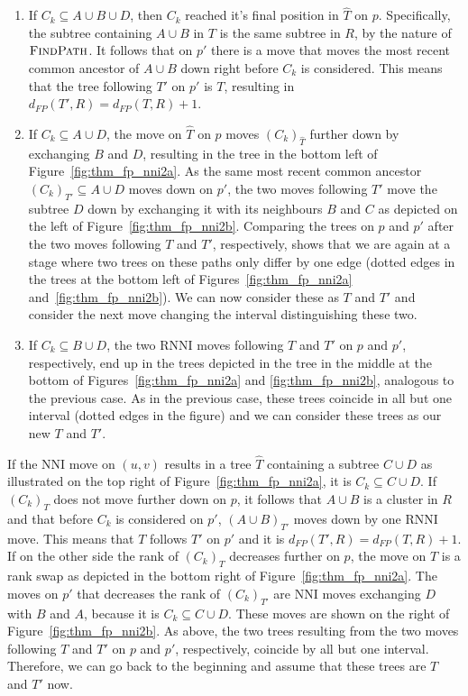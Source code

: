 \documentclass{amsart}
\newcommand{\rnni}{\mathrm{RNNI}}
\newcommand{\findpath}{\textsc{FindPath}}
\newcommand{\nni}{\mathrm{NNI}}
\begin{document}
\begin{enumerate}
    \begin{enumerate}
        \item
            If $C_k \subseteq A \cup B \cup D$, then $C_k$ reached it's final position in $\hat T$ on $p$.
            Specifically, the subtree containing $A \cup B$ in $T$ is the same subtree in $R$, by the nature of $\findpath$.
            It follows that on $p'$ there is a move that moves the most recent common ancestor of $A \cup B$ down right before $C_k$ is considered.
            This means that the tree following $T'$ on $p'$ is $T$, resulting in $d_{FP}(T',R) = d_{FP}(T,R) + 1$.
        \item
            If $C_k \subseteq A \cup D$, the move on $\hat T$ on $p$ moves $(C_k)_{\hat T}$ further down by exchanging $B$ and $D$, resulting in the tree in the bottom left of Figure~\ref{fig:thm_fp_nni2a}.
            As the same most recent common ancestor $(C_k)_{T'} \subseteq A \cup D$ moves down on $p'$, the two moves following $T'$ move the subtree $D$ down by exchanging it with its neighbours $B$ and $C$ as depicted on the left of Figure~\ref{fig:thm_fp_nni2b}.
            Comparing the trees on $p$ and $p'$ after the two moves following $T$ and $T'$, respectively, shows that we are again at a stage where two trees on these paths only differ by one edge (dotted edges in the trees at the bottom left of Figures~\ref{fig:thm_fp_nni2a} and~\ref{fig:thm_fp_nni2b}).
            We can now consider these as $T$ and $T'$ and consider the next move changing the interval distinguishing these two.
        \item
            If $C_k \subseteq B \cup D$, the two $\rnni$ moves following $T$ and $T'$ on $p$ and $p'$, respectively, end up in the trees depicted in the tree in the middle at the bottom of Figures~\ref{fig:thm_fp_nni2a} and \ref{fig:thm_fp_nni2b}, analogous to the previous case.
            As in the previous case, these trees coincide in all but one interval (dotted edges in the figure) and we can consider these trees as our new $T$ and $T'$.
    \end{enumerate}

    If the $\nni$ move on $(u,v)$ results in a tree $\hat T$ containing a subtree $C \cup D$ as illustrated on the top right of Figure~\ref{fig:thm_fp_nni2a}, it is $C_k \subseteq C \cup D$.
    If $(C_k)_T$ does not move further down on $p$, it follows that $A \cup B$ is a cluster in $R$ and that before $C_k$ is considered on $p'$, $(A \cup B)_{T'}$ moves down by one $\rnni$ move.
    This means that $T$ follows $T'$ on $p'$ and it is $d_{FP}(T',R) = d_{FP}(T,R) + 1$.
    If on the other side the rank of $(C_k)_T$ decreases further on $p$, the move on $\hat T$ is a rank swap as depicted in the bottom right of Figure~\ref{fig:thm_fp_nni2a}.
    The moves on $p'$ that decreases the rank of $(C_k)_{T'}$ are $\nni$ moves exchanging $D$ with $B$ and $A$, because it is $C_k \subseteq C \cup D$.
    These moves are shown on the right of Figure~\ref{fig:thm_fp_nni2b}.
    As above, the two trees resulting from the two moves following $T$ and $T'$ on $p$ and $p'$, respectively, coincide by all but one interval.
    Therefore, we can go back to the beginning and assume that these trees are $T$ and $T'$ now.


\end{enumerate}
\end{document}
